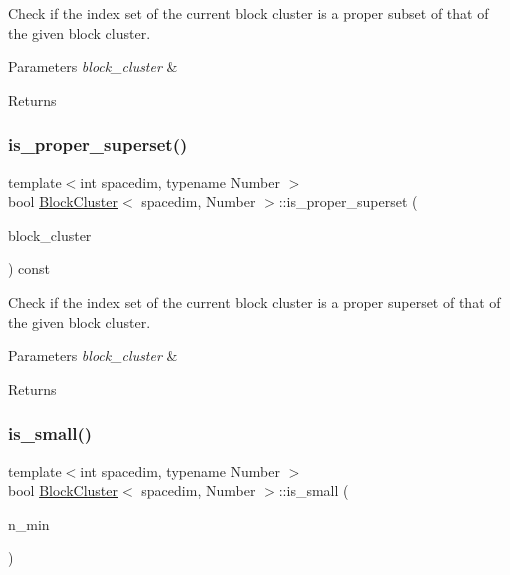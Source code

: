 Check if the index set of the current block cluster is a proper subset of that of the given block cluster. 
\begin{DoxyParams}{Parameters}
{\em block\+\_\+cluster} & \\
\hline
\end{DoxyParams}
\begin{DoxyReturn}{Returns}

\end{DoxyReturn}
\mbox{\label{classBlockCluster_ad81d5a494f48b16662ef471966899b65}} 
\subsubsection{\texorpdfstring{is\+\_\+proper\+\_\+superset()}{is\_proper\_superset()}}
{\footnotesize\ttfamily template$<$int spacedim, typename Number $>$ \\
bool \hyperlink{classBlockCluster}{Block\+Cluster}$<$ spacedim, Number $>$\+::is\+\_\+proper\+\_\+superset (\begin{DoxyParamCaption}\item[{const \hyperlink{classBlockCluster}{Block\+Cluster}$<$ spacedim, Number $>$ \&}]{block\+\_\+cluster }\end{DoxyParamCaption}) const}

Check if the index set of the current block cluster is a proper superset of that of the given block cluster. 
\begin{DoxyParams}{Parameters}
{\em block\+\_\+cluster} & \\
\hline
\end{DoxyParams}
\begin{DoxyReturn}{Returns}

\end{DoxyReturn}
\mbox{\label{classBlockCluster_adb6edc09ec2c579677e0532644b9f57d}} 
\subsubsection{\texorpdfstring{is\+\_\+small()}{is\_small()}}
{\footnotesize\ttfamily template$<$int spacedim, typename Number $>$ \\
bool \hyperlink{classBlockCluster}{Block\+Cluster}$<$ spacedim, Number $>$\+::is\+\_\+small (\begin{DoxyParamCaption}\item[{unsigned int}]{n\+\_\+min }\end{DoxyParamCaption})}

